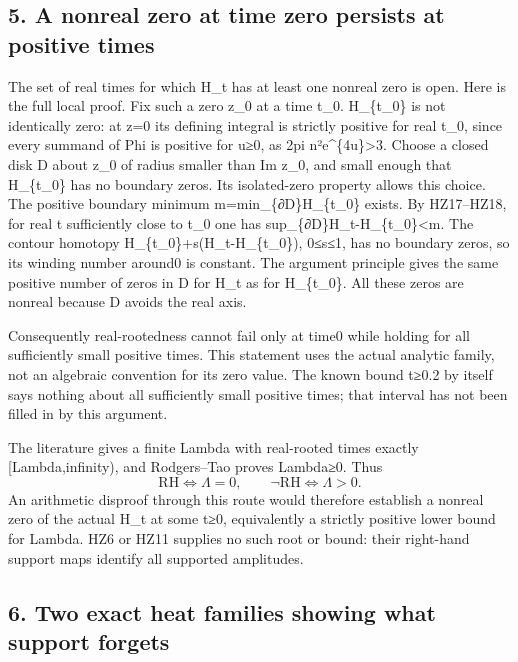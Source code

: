 \documentclass[
]{article}
\begin{document}
\subsection{5. A nonreal zero at time zero persists at positive
times}\label{a-nonreal-zero-at-time-zero-persists-at-positive-times}

The set of real times for which H\_t has at least one nonreal zero is
open. Here is the full local proof. Fix such a zero z\_0 at a time t\_0.
H\_\{t\_0\} is not identically zero: at z=0 its defining integral is
strictly positive for real t\_0, since every summand of Phi is positive
for u≥0, as 2pi n²e\^{}\{4u\}\textgreater3. Choose a closed disk D about
z\_0 of radius smaller than \textbar Im z\_0\textbar, and small enough
that H\_\{t\_0\} has no boundary zeros. Its isolated-zero property
allows this choice. The positive boundary minimum
m=min\_\{∂D\}\textbar H\_\{t\_0\}\textbar{} exists. By HZ17--HZ18, for
real t sufficiently close to t\_0 one has
sup\_\{∂D\}\textbar H\_t-H\_\{t\_0\}\textbar\textless m. The contour
homotopy H\_\{t\_0\}+s(H\_t-H\_\{t\_0\}), 0≤s≤1, has no boundary zeros,
so its winding number around0 is constant. The argument principle gives
the same positive number of zeros in D for H\_t as for H\_\{t\_0\}. All
these zeros are nonreal because D avoids the real axis.

Consequently real-rootedness cannot fail only at time0 while holding for
all sufficiently small positive times. This statement uses the actual
analytic family, not an algebraic convention for its zero value. The
known bound t≥0.2 by itself says nothing about all sufficiently small
positive times; that interval has not been filled in by this argument.

The literature gives a finite Lambda with real-rooted times exactly
{[}Lambda,infinity), and Rodgers--Tao proves Lambda≥0. Thus \[
\mathrm{RH}\iff\Lambda=0,
\qquad
\neg\mathrm{RH}\iff\Lambda>0.
\tag{HZ23}
\] An arithmetic disproof through this route would therefore establish a
nonreal zero of the actual H\_t at some t≥0, equivalently a strictly
positive lower bound for Lambda. HZ6 or HZ11 supplies no such root or
bound: their right-hand support maps identify all supported amplitudes.

\subsection{6. Two exact heat families showing what support
forgets}\label{two-exact-heat-families-showing-what-support-forgets}
\end{document}
